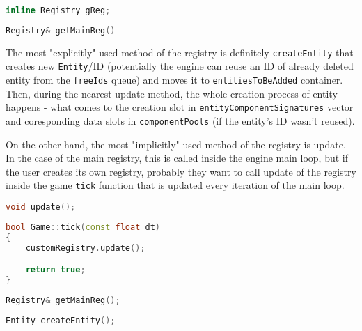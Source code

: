 \begin{lstlisting}[language=c++, caption=Private method of access to the main registry (./tsengine/engine/src/globals.hpp)]
inline Registry gReg;
\end{lstlisting}

\begin{lstlisting}[language=c++, caption=Public method of access to the main registry (./tsengine/engine/src/globals.hpp)]
Registry& getMainReg()
\end{lstlisting}

The most "explicitly" used method of the registry is definitely \texttt{createEntity} that creates new \texttt{Entity}/ID (potentially the engine can reuse an ID of already deleted entity from the \texttt{freeIds} queue) and moves it to \texttt{entitiesToBeAdded} container. Then, during the nearest update method, the whole creation process of entity happens - what comes to the creation slot in \texttt{entityComponentSignatures} vector and coresponding data slots in \texttt{componentPools} (if the entity's ID wasn't reused).

On the other hand, the most "implicitly" used method of the registry is update. In the case of the main registry, this is called inside the engine main loop, but if the user creates its own registry, probably they want to call update of the registry inside the game \texttt{tick} function that is updated every iteration of the main loop.
\begin{lstlisting}[language=c++, caption=ECS Registry update method (./engine/include/tsengine/ecs/ecs.h)]
void update();
\end{lstlisting}

\begin{lstlisting}[language=c++, caption=An example of how custom registry should be updated.]
bool Game::tick(const float dt)
{
    customRegistry.update();

    return true;
}
\end{lstlisting}

\begin{lstlisting}[language=c++, caption=Public method of access to the main registry (./tsengine/engine/src/globals.hpp)]
Registry& getMainReg();
\end{lstlisting}

\begin{lstlisting}[language=c++, caption=Creation of an entity (./engine/include/tsengine/ecs/ecs.h)]
Entity createEntity();
\end{lstlisting}


